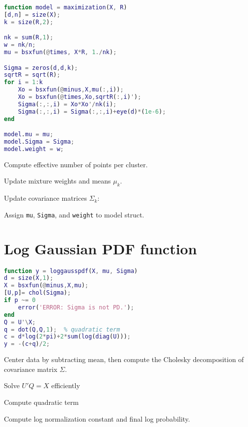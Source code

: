 \documentclass[11pt]{article}
\begin{document}
\begin{minipage}{\textwidth}
\begin{minipage}[t]{0.48\textwidth}
\begin{lstlisting}[language=Matlab, firstnumber=106]
function model = maximization(X, R)
[d,n] = size(X);
k = size(R,2);

nk = sum(R,1);
w = nk/n;
mu = bsxfun(@times, X*R, 1./nk);

Sigma = zeros(d,d,k);
sqrtR = sqrt(R);
for i = 1:k
    Xo = bsxfun(@minus,X,mu(:,i));
    Xo = bsxfun(@times,Xo,sqrtR(:,i)');
    Sigma(:,:,i) = Xo*Xo'/nk(i);
    Sigma(:,:,i) = Sigma(:,:,i)+eye(d)*(1e-6);
end

model.mu = mu;
model.Sigma = Sigma;
model.weight = w;
\end{lstlisting}
\end{minipage}
\hfill
\begin{minipage}[t]{0.48\textwidth}

Compute effective number of points per cluster.

Update mixture weights and means $\mu_k$.

Update covariance matrices $\Sigma_k$:

Assign \texttt{mu}, \texttt{Sigma}, and \texttt{weight} to model struct.

\end{minipage}
\end{minipage}

\vspace{0.5cm}

\section{Log Gaussian PDF function}

\begin{minipage}{\textwidth}
\begin{minipage}[t]{0.48\textwidth}
\begin{lstlisting}[language=Matlab, firstnumber=127]
function y = loggausspdf(X, mu, Sigma)
d = size(X,1);
X = bsxfun(@minus,X,mu);
[U,p]= chol(Sigma);
if p ~= 0
    error('ERROR: Sigma is not PD.');
end
Q = U'\X;
q = dot(Q,Q,1);  % quadratic term
c = d*log(2*pi)+2*sum(log(diag(U)));
y = -(c+q)/2;
\end{lstlisting}
\end{minipage}
\hfill
\begin{minipage}[t]{0.48\textwidth}
    
Center data by subtracting mean, then compute the Cholesky decomposition of covariance matrix $\Sigma$.

Solve $U'Q = X$ efficiently

Compute quadratic term

Compute log normalization constant and final log probability.
\end{minipage}
\end{minipage}
\end{document}
